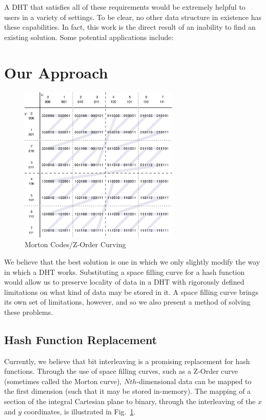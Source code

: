 \documentclass[10pt]{IEEEtran}
\begin{document}
\par A DHT that satisfies all of these requirements would be extremely helpful to users in a variety of settings. To be clear, no other data structure in existence has these capabilities. In fact, this work is the direct result of an inability to find an existing solution. Some potential applications include:



\section{Our Approach}
\begin{figure}[!t]
\centering
\includegraphics[width=3in]{ZCurve}
\caption{Morton Codes/Z-Order Curving~\cite{ZorderCurve:2015vo}}
\label{fig_MCode}
\end{figure}

\par We believe that the best solution is one in which we only slightly modify the way in which a DHT works. Substituting a space filling curve for a hash function would allow us to preserve locality of data in a DHT with rigorously defined limitations on what kind of data may be stored in it. A space filling curve brings its own set of limitations, however, and so we also present a method of solving these problems.

\subsection{Hash Function Replacement}

\par Currently, we believe that bit interleaving is a promising replacement for hash functions. Through the use of space filling curves, such as a Z-Order curve (sometimes called the Morton curve), $Nth$-dimensional data can be mapped to the first dimension (such that it may be stored in-memory). The mapping of a section of the integral Cartesian plane to binary, through the interleaving of the $x$ and $y$ coordinates, is illustrated in Fig.~\ref{fig_MCode}.
\end{document}
